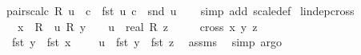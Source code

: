 \begin{isabellebody}
\isamarkupfalse%
%
\endisatagproof
{\isafoldproof}%
%
\isadelimproof
\isanewline
%
\endisadelimproof
\isanewline
{}\isamarkupfalse%
\ pair{\isacharunderscore}{\kern0pt}scal{\isacharcolon}{\kern0pt}{\isachardoublequoteopen}c\ {\isacharasterisk}{\kern0pt}\isactrlsub R\ u\ {\isacharequal}{\kern0pt}\ {\isacharparenleft}{\kern0pt}c\ {\isacharasterisk}{\kern0pt}\ fst\ u{\isacharcomma}{\kern0pt}\ c\ {\isacharasterisk}{\kern0pt}\ snd\ u{\isacharparenright}{\kern0pt}{\isachardoublequoteclose}\isanewline
%
\isadelimproof
\ \ %
\endisadelimproof
%
\isatagproof
{}\isamarkupfalse%
\ {\isacharparenleft}{\kern0pt}simp\ add{\isacharcolon}{\kern0pt}\ scale{\isacharunderscore}{\kern0pt}def{\isacharparenright}{\kern0pt}%
\endisatagproof
{\isafoldproof}%
%
\isadelimproof
\isanewline
%
\endisadelimproof
\isanewline
\isanewline
\isanewline
{}\isamarkupfalse%
\ lindep{\isacharunderscore}{\kern0pt}cross{}{\isacharunderscore}{\kern0pt}{}{\isacharcolon}{\kern0pt}\isanewline
\ \ \ {\isachardoublequoteopen}{\isacharparenleft}{\kern0pt}x\ {\isacharcolon}{\kern0pt}{\isacharcolon}{\kern0pt}\ R{}{\isacharparenright}{\kern0pt}\ {\isacharequal}{\kern0pt}\ u\ {\isacharasterisk}{\kern0pt}\isactrlsub R\ y\ {\isacharplus}{\kern0pt}\ {\isacharparenleft}{\kern0pt}{}\ {\isacharminus}{\kern0pt}\ {\isacharparenleft}{\kern0pt}u\ {\isacharcolon}{\kern0pt}{\isacharcolon}{\kern0pt}\ real{\isacharparenright}{\kern0pt}{\isacharparenright}{\kern0pt}\ {\isacharasterisk}{\kern0pt}\isactrlsub R\ z{\isachardoublequoteclose}\isanewline
\ \ \ \ \ {\isachardoublequoteopen}cross{}\ x\ y\ z\ {\isacharequal}{\kern0pt}\ {}{\isachardoublequoteclose}\isanewline
%
\isadelimproof
%
\endisadelimproof
%
\isatagproof
{}\isamarkupfalse%
{\isacharminus}{\kern0pt}\isanewline
\ \ \isamarkupfalse%
\ {}{\isacharcolon}{\kern0pt}\ {\isachardoublequoteopen}fst\ y\ {\isacharminus}{\kern0pt}\ fst\ x\ {\isacharequal}{\kern0pt}\ \ {\isacharparenleft}{\kern0pt}{}\ {\isacharminus}{\kern0pt}\ u{\isacharparenright}{\kern0pt}\ {\isacharasterisk}{\kern0pt}\ {\isacharparenleft}{\kern0pt}fst\ y\ {\isacharminus}{\kern0pt}\ fst\ z{\isacharparenright}{\kern0pt}{\isachardoublequoteclose}\ \isamarkupfalse%
\ assms\ \isamarkupfalse%
\ {\isacharparenleft}{\kern0pt}simp{\isacharcomma}{\kern0pt}\ argo{\isacharparenright}{\kern0pt}\isanewline
\ \ \isamarkupfalse%

\end{isabellebody}
